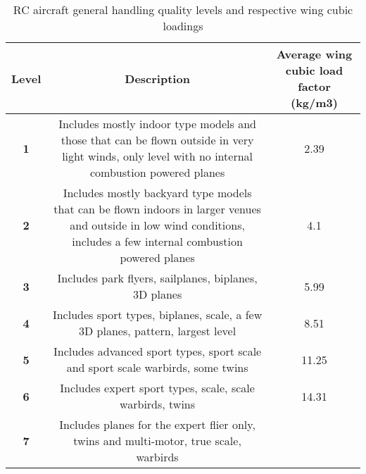 \begin{table}[H]
\centering

    \begin{tabular}{@{}cCc@{}}
    \toprule
    \textbf{Level} & \textbf{Description}                                                                                                                                                  & \textbf{Average wing cubic load factor (kg/m3)} \\ \midrule
    \textbf{1}     & Includes mostly indoor type models and those that can be flown outside in very light winds, only level with no internal combustion powered planes                     & 2.39                                            \\
    \textbf{2}     & Includes mostly backyard type models that can be flown indoors in larger venues and outside in low wind conditions, includes a few internal combustion powered planes & 4.1                                             \\
    \textbf{3}     & Includes park flyers, sailplanes, biplanes, 3D planes                                                                                                                 & 5.99                                            \\
    \textbf{4}     & Includes sport types, biplanes, scale, a few 3D planes, pattern, largest level                                                                                        & 8.51                                            \\
    \textbf{5}     & Includes advanced sport types, sport scale and sport scale warbirds, some twins                                                                                       & 11.25                                           \\
    \textbf{6}     & Includes expert sport types, scale, scale warbirds, twins                                                                                                             & 14.31                                           \\
    \textbf{7}     & Includes planes for the expert flier only, twins and multi-motor, true scale, warbirds   
    \end{tabular}
\caption{RC aircraft general handling quality levels and respective wing cubic loadings}
\label{tab: wing_cubic}
\end{table}
